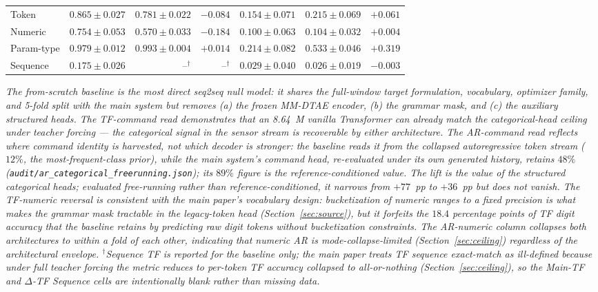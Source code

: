 \begin{table}[ht]
{\begin{tabular}{l r r r r r r}
Token      & $0.865 \pm 0.027$ & $0.781 \pm 0.022$ & $\mathbf{-0.084}$   & $0.154 \pm 0.071$ & $0.215 \pm 0.069$ & $\mathbf{+0.061}$ \\
Numeric    & $0.754 \pm 0.053$ & $0.570 \pm 0.033$ & $\mathbf{-0.184}$   & $0.100 \pm 0.063$ & $0.104 \pm 0.032$ & $+0.004$ \\
Param-type & $0.979 \pm 0.012$ & $0.993 \pm 0.004$ & $+0.014$            & $0.214 \pm 0.082$ & $0.533 \pm 0.046$ & $\mathbf{+0.319}$ \\
Sequence   & $0.175 \pm 0.026$ & --$^{\dagger}$     & --$^{\dagger}$      & $0.029 \pm 0.040$ & $0.026 \pm 0.019$ & $-0.003$          \\
\bottomrule
\end{tabular}%
}
\par\smallskip
\footnotesize\textit{The from-scratch baseline is the most direct seq2seq null model: it shares the full-window target formulation, vocabulary, optimizer family, and 5-fold split with the main system but removes (a) the frozen MM-DTAE encoder, (b) the grammar mask, and (c) the auxiliary structured heads. The TF-command read demonstrates that an 8.64~M vanilla Transformer can already match the categorical-head ceiling under teacher forcing --- the categorical signal in the sensor stream is recoverable by either architecture. The AR-command read reflects \emph{where} command identity is harvested, not which decoder is stronger: the baseline reads it from the collapsed autoregressive token stream ($12\%$, the most-frequent-class prior), while the main system's command head, re-evaluated under its own generated history, retains $48\%$ (\texttt{audit/ar\_categorical\_freerunning.json}); its $89\%$ figure is the reference-conditioned value. The lift is the value of the structured categorical heads; evaluated free-running rather than reference-conditioned, it narrows from $+77$~pp to $+36$~pp but does not vanish. The TF-numeric reversal is consistent with the main paper's vocabulary design: bucketization of numeric ranges to a fixed precision is what makes the grammar mask tractable in the legacy-token head (Section~\ref{sec:source}), but it forfeits the $18.4$ percentage points of TF digit accuracy that the baseline retains by predicting raw digit tokens without bucketization constraints. The AR-numeric column collapses both architectures to within a fold of each other, indicating that numeric AR is mode-collapse-limited (Section~\ref{sec:ceiling}) regardless of the architectural envelope. $^{\dagger}$Sequence TF is reported for the baseline only; the main paper treats TF sequence exact-match as ill-defined because under full teacher forcing the metric reduces to per-token TF accuracy collapsed to all-or-nothing (Section~\ref{sec:ceiling}), so the Main-TF and $\Delta$-TF Sequence cells are intentionally blank rather than missing data.}
\end{table}

